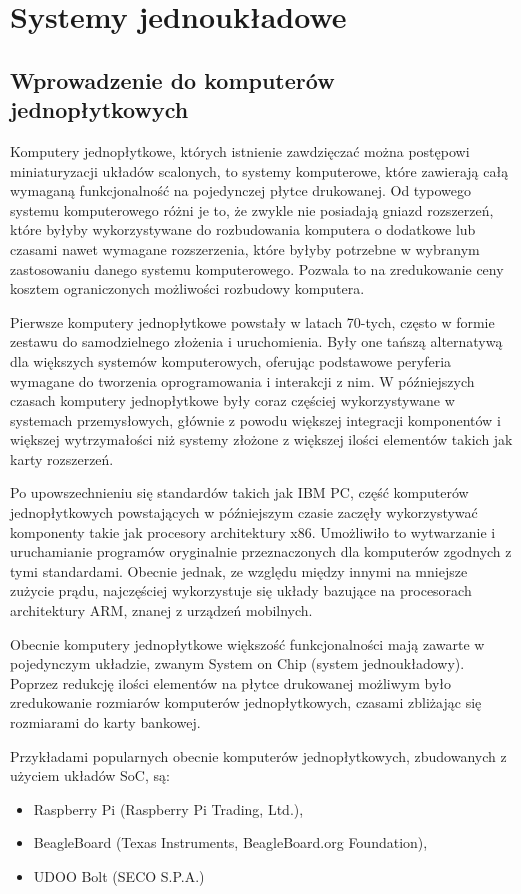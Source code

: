 \section{Systemy jednoukładowe}

\subsection{Wprowadzenie do komputerów jednopłytkowych}

Komputery jednopłytkowe, których istnienie zawdzięczać można postępowi miniaturyzacji układów scalonych, to systemy komputerowe, które zawierają całą wymaganą funkcjonalność na pojedynczej płytce drukowanej. Od typowego systemu komputerowego różni je to, że zwykle nie posiadają gniazd rozszerzeń, które byłyby wykorzystywane do rozbudowania komputera o dodatkowe lub czasami nawet wymagane rozszerzenia, które byłyby potrzebne w wybranym zastosowaniu danego systemu komputerowego. Pozwala to na zredukowanie ceny kosztem ograniczonych możliwości rozbudowy komputera.

Pierwsze komputery jednopłytkowe powstały w latach 70-tych\cite{Ariza_2021}, często w formie zestawu do samodzielnego złożenia i uruchomienia. Były one tańszą alternatywą dla większych systemów komputerowych, oferując podstawowe peryferia wymagane do tworzenia oprogramowania i interakcji z nim.
W późniejszych czasach komputery jednopłytkowe były coraz częściej wykorzystywane w systemach przemysłowych, głównie z powodu większej integracji komponentów i większej wytrzymałości niż systemy złożone z większej ilości elementów takich jak karty rozszerzeń.

Po upowszechnieniu się standardów takich jak IBM PC\cite{ibmpc1981}, część komputerów jednopłytkowych powstających w późniejszym czasie zaczęły wykorzystywać komponenty takie jak procesory architektury x86. Umożliwiło to wytwarzanie i uruchamianie programów oryginalnie przeznaczonych dla komputerów zgodnych z tymi standardami. Obecnie jednak, ze względu między innymi na mniejsze zużycie prądu, najczęściej wykorzystuje się układy bazujące na procesorach architektury ARM, znanej z urządzeń mobilnych.

Obecnie komputery jednopłytkowe większość funkcjonalności mają zawarte w pojedynczym układzie, zwanym System on Chip (system jednoukładowy). Poprzez redukcję ilości elementów na płytce drukowanej możliwym było zredukowanie rozmiarów komputerów jednopłytkowych, czasami zbliżając się rozmiarami do karty bankowej.

Przykładami popularnych obecnie komputerów jednopłytkowych, zbudowanych z użyciem układów SoC, są:
\begin{itemize}
	\item Raspberry Pi\cite{rpi1bplus} (Raspberry Pi Trading, Ltd.),
	\item BeagleBoard\cite{beagleboard} (Texas Instruments, BeagleBoard.org Foundation),
	\item UDOO Bolt\cite{udoobolt} (SECO S.P.A.)
\end{itemize}

